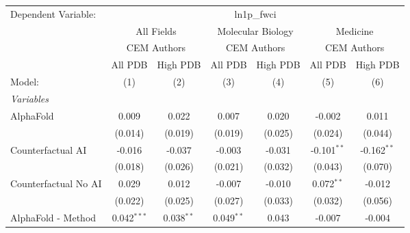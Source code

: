 \begingroup
\centering
\begin{tabular}{lcccccc}
   \tabularnewline \midrule \midrule
   Dependent Variable: & \multicolumn{6}{c}{ln1p\_fwci}\\
 & \multicolumn{2}{c}{All Fields} & \multicolumn{2}{c}{Molecular Biology} & \multicolumn{2}{c}{Medicine} \\
\cmidrule(lr){2-3} \cmidrule(lr){4-5} \cmidrule(lr){6-7}
 & \multicolumn{2}{c}{CEM Authors} & \multicolumn{2}{c}{CEM Authors} & \multicolumn{2}{c}{CEM Authors} \\
\cmidrule(lr){2-3} \cmidrule(lr){4-5} \cmidrule(lr){6-7}
 & \multicolumn{1}{c}{All PDB} & \multicolumn{1}{c}{High PDB} & \multicolumn{1}{c}{All PDB} & \multicolumn{1}{c}{High PDB} & \multicolumn{1}{c}{All PDB} & \multicolumn{1}{c}{High PDB} \\
\cmidrule(lr){2-2} \cmidrule(lr){3-3} \cmidrule(lr){4-4} \cmidrule(lr){5-5} \cmidrule(lr){6-6} \cmidrule(lr){7-7}
   Model:                                                     & (1)           & (2)          & (3)          & (4)           & (5)           & (6)\\  
   \midrule
   \emph{Variables}\\
   AlphaFold                                                  & 0.009         & 0.022        & 0.007        & 0.020         & -0.002        & 0.011\\   
                                                              & (0.014)       & (0.019)      & (0.019)      & (0.025)       & (0.024)       & (0.044)\\   
   Counterfactual AI                                          & -0.016        & -0.037       & -0.003       & -0.031        & -0.101$^{**}$ & -0.162$^{**}$\\   
                                                              & (0.018)       & (0.026)      & (0.021)      & (0.032)       & (0.043)       & (0.070)\\   
   Counterfactual No AI                                       & 0.029         & 0.012        & -0.007       & -0.010        & 0.072$^{**}$  & -0.012\\   
                                                              & (0.022)       & (0.025)      & (0.027)      & (0.033)       & (0.032)       & (0.056)\\   
   AlphaFold - Method                                         & 0.042$^{***}$ & 0.038$^{**}$ & 0.049$^{**}$ & 0.043         & -0.007        & -0.004\\   

\end{tabular}
